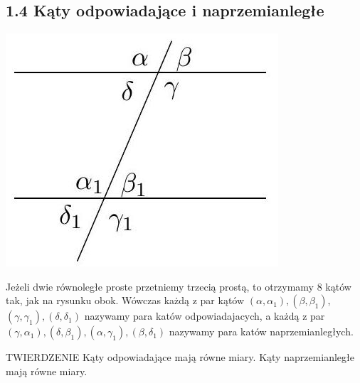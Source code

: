 \documentclass[10pt]{article}
\begin{document}
\subsection*{1.4 Kąty odpowiadające i naprzemianległe}
\begin{center}
\includegraphics[max width=\textwidth]{2024_11_21_71f62bd117d375398909g-011}
\end{center}

Jeżeli dwie równoległe proste przetniemy trzecią prostą, to otrzymamy 8 kątów tak, jak na rysunku obok. Wówczas każdą z par kątów \(\left(\alpha, \alpha_{1}\right),\left(\beta, \beta_{1}\right)\), \(\left(\gamma, \gamma_{1}\right),\left(\delta, \delta_{1}\right)\) nazywamy para katów odpowiadajacych, a każdą z par \(\left(\gamma, \alpha_{1}\right),\left(\delta, \beta_{1}\right),\left(\alpha, \gamma_{1}\right),\left(\beta, \delta_{1}\right)\) nazywamy para katów naprzemianległych.

TWIERDZENIE Kąty odpowiadające mają równe miary. Kąty naprzemianległe mają równe miary.
\end{document}

